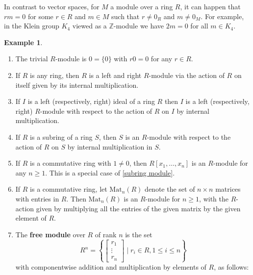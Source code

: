 \documentclass[12pt]{report}
\numberwithin{equation}{section}
\numberwithin{theorem}{chapter}
\theoremstyle{definition}
\newtheorem{example}[theorem]{Example}
\newtheorem*{basic properties}{Basic Properties}
\newtheorem*{Important Remark}{Important Remark}
\newcommand{\df}[1]{{\bf #1}\index{#1}}
\begin{document}
In contrast to vector spaces, for $M$ a module over a ring $R$, it can happen that $rm=0$ for some $r \in R$ and $m \in M$ such that $r \neq 0_R$ and $m \neq 0_M$. For example, in the Klein group $K_4$ viewed as a $\mathbb{Z}$-module we have $2m=0$ for all $m \in K_4$.


\begin{example}
\begin{enumerate}[label=(\arabic*)]
\item The trivial $R$-module is $0=\{0\}$ with $r0=0$ for any $r\in R$.
\item If $R$ is any ring, then $R$ is a left and right $R$-module via the action of $R$ on itself given by its internal multiplication.
\item If $I$ is a left (respectively, right) ideal of a ring $R$ then $I$ is a left (respectively, right) $R$-module with respect to the action of $R$ on $I$ by internal multiplication. 
\item\label{subring module} If $R$ is a subring of a ring $S$, then $S$ is an $R$-module with respect to the action of $R$ on $S$ by internal multiplication in $S$.
\item If $R$ is a commutative ring with $1 \neq 0$, then $R[x_1,\ldots,x_n]$ is an $R$-module for any $n \geqslant 1$. This is a special case of \ref{subring module}.
\item If $R$ is a commutative ring, let $\mathrm{Mat}_n(R)$ denote the set of $n \times n$ matrices with entries in $R$. Then $\mathrm{Mat}_n(R)$ is an $R$-module for $n\geqslant 1$, with the $R$-action given by multiplying all the entries of the given matrix by the given element of $R$.
\item The \df{free module} over $R$ of rank $n$ is the set
$$R^n=\left\{\begin{bmatrix} r_1\\ \vdots\\r_n \end{bmatrix} \mid r_i\in R, 1 \leqslant i \leqslant n\right\}$$
with componentwise addition and multiplication by elements of $R$, as follows:

\end{enumerate}
\end{example}
\end{document}
